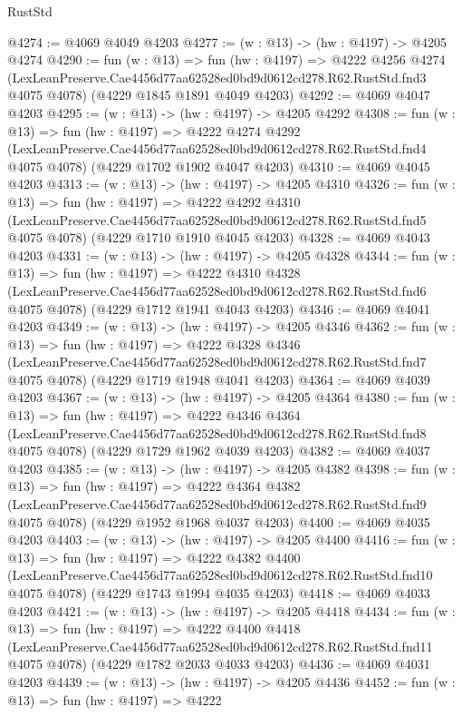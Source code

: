 \begin{lexlean}{RustStd}
\begin{coremodule}
@4274 := @4069 @4049 @4203
@4277 := (w : @13) -> (hw : @4197) -> @4205 @4274
@4290 := fun (w : @13) =>
  fun (hw : @4197) =>
  @4222
    @4256
    @4274
    (LexLeanPreserve.Cae4456d77aa62528ed0bd9d0612cd278.R62.RustStd.fnd3 @4075 @4078)
    (@4229 @1845 @1891 @4049 @4203)
@4292 := @4069 @4047 @4203
@4295 := (w : @13) -> (hw : @4197) -> @4205 @4292
@4308 := fun (w : @13) =>
  fun (hw : @4197) =>
  @4222
    @4274
    @4292
    (LexLeanPreserve.Cae4456d77aa62528ed0bd9d0612cd278.R62.RustStd.fnd4 @4075 @4078)
    (@4229 @1702 @1902 @4047 @4203)
@4310 := @4069 @4045 @4203
@4313 := (w : @13) -> (hw : @4197) -> @4205 @4310
@4326 := fun (w : @13) =>
  fun (hw : @4197) =>
  @4222
    @4292
    @4310
    (LexLeanPreserve.Cae4456d77aa62528ed0bd9d0612cd278.R62.RustStd.fnd5 @4075 @4078)
    (@4229 @1710 @1910 @4045 @4203)
@4328 := @4069 @4043 @4203
@4331 := (w : @13) -> (hw : @4197) -> @4205 @4328
@4344 := fun (w : @13) =>
  fun (hw : @4197) =>
  @4222
    @4310
    @4328
    (LexLeanPreserve.Cae4456d77aa62528ed0bd9d0612cd278.R62.RustStd.fnd6 @4075 @4078)
    (@4229 @1712 @1941 @4043 @4203)
@4346 := @4069 @4041 @4203
@4349 := (w : @13) -> (hw : @4197) -> @4205 @4346
@4362 := fun (w : @13) =>
  fun (hw : @4197) =>
  @4222
    @4328
    @4346
    (LexLeanPreserve.Cae4456d77aa62528ed0bd9d0612cd278.R62.RustStd.fnd7 @4075 @4078)
    (@4229 @1719 @1948 @4041 @4203)
@4364 := @4069 @4039 @4203
@4367 := (w : @13) -> (hw : @4197) -> @4205 @4364
@4380 := fun (w : @13) =>
  fun (hw : @4197) =>
  @4222
    @4346
    @4364
    (LexLeanPreserve.Cae4456d77aa62528ed0bd9d0612cd278.R62.RustStd.fnd8 @4075 @4078)
    (@4229 @1729 @1962 @4039 @4203)
@4382 := @4069 @4037 @4203
@4385 := (w : @13) -> (hw : @4197) -> @4205 @4382
@4398 := fun (w : @13) =>
  fun (hw : @4197) =>
  @4222
    @4364
    @4382
    (LexLeanPreserve.Cae4456d77aa62528ed0bd9d0612cd278.R62.RustStd.fnd9 @4075 @4078)
    (@4229 @1952 @1968 @4037 @4203)
@4400 := @4069 @4035 @4203
@4403 := (w : @13) -> (hw : @4197) -> @4205 @4400
@4416 := fun (w : @13) =>
  fun (hw : @4197) =>
  @4222
    @4382
    @4400
    (LexLeanPreserve.Cae4456d77aa62528ed0bd9d0612cd278.R62.RustStd.fnd10 @4075 @4078)
    (@4229 @1743 @1994 @4035 @4203)
@4418 := @4069 @4033 @4203
@4421 := (w : @13) -> (hw : @4197) -> @4205 @4418
@4434 := fun (w : @13) =>
  fun (hw : @4197) =>
  @4222
    @4400
    @4418
    (LexLeanPreserve.Cae4456d77aa62528ed0bd9d0612cd278.R62.RustStd.fnd11 @4075 @4078)
    (@4229 @1782 @2033 @4033 @4203)
@4436 := @4069 @4031 @4203
@4439 := (w : @13) -> (hw : @4197) -> @4205 @4436
@4452 := fun (w : @13) =>
  fun (hw : @4197) =>
  @4222

\end{coremodule}
\end{lexlean}
